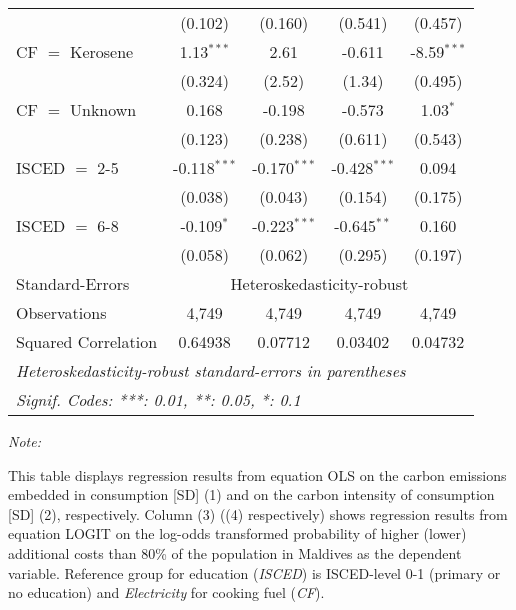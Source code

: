 \begin{table}[htbp!]
\begin{adjustbox}{width = 1\textwidth, max height = 0.95\textheight, center}
\begin{threeparttable}[b]
\begin{tabular}{lcccc}
                                 & (0.102)            & (0.160)            & (0.541)        & (0.457)\\   
            CF $=$ Kerosene      & 1.13$^{***}$       & 2.61               & -0.611         & -8.59$^{***}$\\   
                                 & (0.324)            & (2.52)             & (1.34)         & (0.495)\\   
            CF $=$ Unknown       & 0.168              & -0.198             & -0.573         & 1.03$^{*}$\\   
                                 & (0.123)            & (0.238)            & (0.611)        & (0.543)\\   
            ISCED $=$ 2-5        & -0.118$^{***}$     & -0.170$^{***}$     & -0.428$^{***}$ & 0.094\\   
                                 & (0.038)            & (0.043)            & (0.154)        & (0.175)\\   
            ISCED $=$ 6-8        & -0.109$^{*}$       & -0.223$^{***}$     & -0.645$^{**}$  & 0.160\\   
                                 & (0.058)            & (0.062)            & (0.295)        & (0.197)\\   
            \midrule 
            Standard-Errors & \multicolumn{4}{c}{Heteroskedasticity-robust} \\ 
            Observations         & 4,749              & 4,749              & 4,749          & 4,749\\  
            Squared Correlation  & 0.64938            & 0.07712            & 0.03402        & 0.04732\\  
            \midrule \midrule
            \multicolumn{5}{l}{\emph{Heteroskedasticity-robust standard-errors in parentheses}}\\
            \multicolumn{5}{l}{\emph{Signif. Codes: ***: 0.01, **: 0.05, *: 0.1}}\\
         \end{tabular}
         
         \begin{tablenotes}\item \medskip \textit{Note:}
            \item This table displays regression results from equation OLS on the carbon emissions embedded in consumption [SD] (1) and on the carbon intensity of consumption [SD] (2), respectively. 
                                      Column (3) ((4) respectively) shows regression results from equation LOGIT on the log-odds transformed probability of higher (lower) additional costs than 80\% of the population in Maldives as the dependent variable. Reference group for education (\textit{ISCED}) is ISCED-level 0-1 (primary or no education) and \textit{Electricity} for cooking fuel (\textit{CF}).
         \end{tablenotes}
      \end{threeparttable}
   \end{adjustbox}
\end{table}


